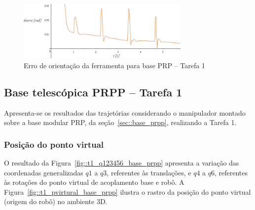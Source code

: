 \begin{figure}[h!]
	\centering 
 	\includegraphics[width=0.75\textwidth]{figs/t1_erroori_base_prp}
 	\caption{Erro de orientação da ferramenta para base PRP -- Tarefa
 	1}
 	\label{fig::t1_erroori_base_prp}
\end{figure}


\clearpage
\subsection{Base telescópica PRPP -- Tarefa 1} \label{sec::res_prpp}

Apresenta-se os resultados das trajetórias considerando o manipulador montado
sobre a base modular PRP, da seção~\ref{sec::base_prpp}, realizando a Tarefa 1.

\subsubsection{Posição do ponto virtual}

O resultado da Figura~\ref{fig::t1_q123456_base_prpp} apresenta a variação das
coordenadas generalizadas $q1$ a $q3$, referentes às translações, e $q4$ a $q6$,
referentes às rotações do ponto virtual de acoplamento base e robô. A
Figura~\ref{fig::t1_pvirtural_base_prpp} ilustra o rastro da posição do ponto
virtual (origem do robô) no ambiente 3D.


